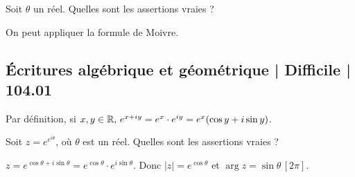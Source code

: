 \begin{question}
 
Soit $\theta$ un réel.  Quelles sont les assertions vraies ?
\begin{answers}
    \good{$\cos(5\theta)= \cos^5\theta -10\cos^3\theta \sin^2\theta + 5\cos \theta\sin^4 \theta$}
    
    \bad{$\cos(5\theta)= \cos^5\theta +10\cos^3\theta \sin^2\theta + 5\cos \theta\sin^4 \theta$}

    \bad{$\sin(5\theta)= 5\cos^4\theta \sin\theta+10\cos^2\theta \sin^3\theta + \sin^5\theta$}

    \good{$\sin(5\theta)= 5\cos^4\theta \sin\theta-10\cos^2\theta \sin^3\theta + \sin^5\theta$}
\end{answers}
\begin{explanations}
On peut appliquer la formule de Moivre.

\end{explanations}

\end{question}


\subsection{Écritures algébrique et géométrique | Difficile | 104.01}

\begin{question}

Par définition, si  $x,y \in \mathbb{R}, \, e^{x+iy} = e^x \cdot e^{iy}= e^x (\cos y +i \sin y)$.

Soit $z=e^{e^{i\theta}}$, où $\theta$ est un réel. Quelles sont les assertions vraies ?
\begin{answers}
    
    


\end{answers}
\begin{explanations}
$z= e^{\cos  \theta + i \sin \theta}= e^{\cos\theta}\cdot e^{i \sin \theta}.  $ Donc $|z|=e^{\cos \theta} $ et $\arg z = \sin \theta \, [2\pi]$.
\end{explanations}

\end{question}


